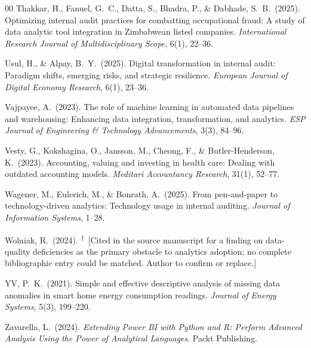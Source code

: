 \documentclass[preprint,12pt]{elsarticle}
\newcommand{\rvr}{\textsuperscript{$\dagger$}}
\begin{document}
\begin{thebibliography}{00}
 Thakkar, H., Fanuel, G.\ C., Datta, S., Bhadra, P., \& Dabhade, S.\ B.\ (2025). Optimizing internal audit practices for combatting occupational fraud: A study of data analytic tool integration in Zimbabwean listed companies. \emph{International Research Journal of Multidisciplinary Scope}, 6(1), 22--36.

 Usul, H., \& Alpay, B.\ Y.\ (2025). Digital transformation in internal audit: Paradigm shifts, emerging risks, and strategic resilience. \emph{European Journal of Digital Economy Research}, 6(1), 23--36.

 Vajpayee, A.\ (2023). The role of machine learning in automated data pipelines and warehousing: Enhancing data integration, transformation, and analytics. \emph{ESP Journal of Engineering \& Technology Advancements}, 3(3), 84--96.

 Vesty, G., Kokshagina, O., Jansson, M., Cheong, F., \& Butler-Henderson, K.\ (2023). Accounting, valuing and investing in health care: Dealing with outdated accounting models. \emph{Meditari Accountancy Research}, 31(1), 52--77.

 Wagener, M., Eulerich, M., \& Bonrath, A.\ (2025). From pen-and-paper to technology-driven analytics: Technology usage in internal auditing. \emph{Journal of Information Systems}, 1--28.

 Wolniak, R.\ (2024). \rvr\ [Cited in the source manuscript for a finding on data-quality deficiencies as the primary obstacle to analytics adoption; no complete bibliographic entry could be matched. Author to confirm or replace.]

 YV, P.\ K.\ (2021). Simple and effective descriptive analysis of missing data anomalies in smart home energy consumption readings. \emph{Journal of Energy Systems}, 5(3), 199--220.

 Zavarella, L.\ (2024). \emph{Extending Power BI with Python and R: Perform Advanced Analysis Using the Power of Analytical Languages}. Packt Publishing.

\end{thebibliography}
\end{document}
